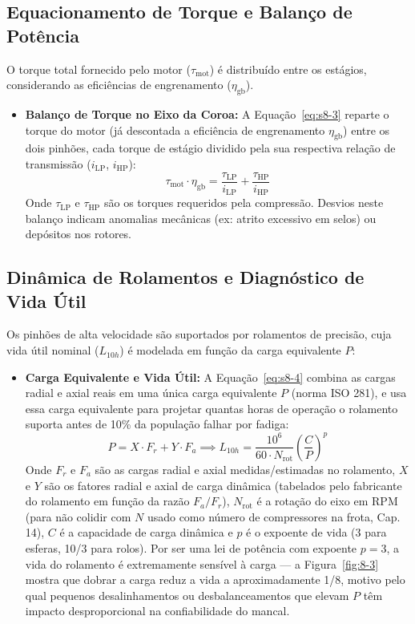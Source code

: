 \documentclass[12pt,a4paper]{article}
\numberwithin{equation}{section}
\numberwithin{table}{section}
\numberwithin{figure}{section}
\begin{document}
{	\subsection{\textbf{Equacionamento de Torque e Balanço de Potência}}
	O torque total fornecido pelo motor ($\tau_{\text{mot}}$) é distribuído entre os estágios, considerando as eficiências de engrenamento ($\eta_{\text{gb}}$).
	\begin{itemize}
		\item \textbf{Balanço de Torque no Eixo da Coroa:} A Equação~\eqref{eq:s8-3} reparte o torque do motor (já descontada a eficiência de engrenamento $\eta_{\text{gb}}$) entre os dois pinhões, cada torque de estágio dividido pela sua respectiva relação de transmissão ($i_{\text{LP}}$, $i_{\text{HP}}$):
		\begin{equation}\label{eq:s8-3}
 \tau_{\text{mot}} \cdot \eta_{\text{gb}} = \frac{\tau_{\text{LP}}}{i_{\text{LP}}} + \frac{\tau_{\text{HP}}}{i_{\text{HP}}}
\end{equation}
		Onde $\tau_{\text{LP}}$ e $\tau_{\text{HP}}$ são os torques requeridos pela compressão. Desvios neste balanço indicam anomalias mecânicas (ex: atrito excessivo em selos) ou depósitos nos rotores.
	\end{itemize}
	
	\subsection{\textbf{Dinâmica de Rolamentos e Diagnóstico de Vida Útil}}
	Os pinhões de alta velocidade são suportados por rolamentos de precisão, cuja vida útil nominal ($L_{10h}$) é modelada em função da carga equivalente $P$:
	\begin{itemize}
		\item \textbf{Carga Equivalente e Vida Útil:} A Equação~\eqref{eq:s8-4} combina as cargas radial e axial reais em uma única carga equivalente $P$ (norma ISO 281), e usa essa carga equivalente para projetar quantas horas de operação o rolamento suporta antes de 10\% da população falhar por fadiga:
		\begin{equation}\label{eq:s8-4}
 P = X \cdot F_r + Y \cdot F_a \implies L_{10h} = \frac{10^6}{60 \cdot N_{\text{rot}}} \left( \frac{C}{P} \right)^p
\end{equation}
		Onde $F_r$ e $F_a$ são as cargas radial e axial medidas/estimadas no rolamento, $X$ e $Y$ são os fatores radial e axial de carga dinâmica (tabelados pelo fabricante do rolamento em função da razão $F_a/F_r$), $N_{\text{rot}}$ é a rotação do eixo em RPM (para não colidir com $N$ usado como número de compressores na frota, Cap. 14), $C$ é a capacidade de carga dinâmica e $p$ é o expoente de vida (3 para esferas, 10/3 para rolos). Por ser uma lei de potência com expoente $p=3$, a vida do rolamento é extremamente sensível à carga — a Figura~\ref{fig:8-3} mostra que dobrar a carga reduz a vida a aproximadamente 1/8, motivo pelo qual pequenos desalinhamentos ou desbalanceamentos que elevam $P$ têm impacto desproporcional na confiabilidade do mancal.


\end{itemize}}
\end{document}
